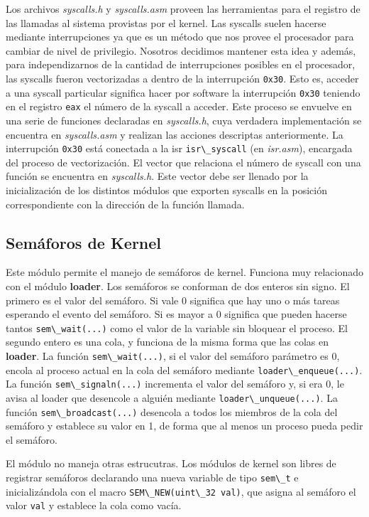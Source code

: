 \documentclass[a4paper]{article}
\newcommand{\file}[1]{\textit{#1}}
\newcommand{\func}[1]{\lstinline{#1}}
\begin{document}
Los archivos \file{syscalls.h} y \file{syscalls.asm} proveen las herramientas para el registro de las llamadas al sistema provistas por el kernel. Las syscalls suelen hacerse mediante interrupciones ya que es un método que nos provee el procesador para cambiar de nivel de privilegio. Nosotros decidimos mantener esta idea y además, para independizarnos de la cantidad de interrupciones posibles en el procesador, las syscalls fueron vectorizadas a dentro de la interrupción \func{0x30}. Esto es, acceder a una syscall particular significa hacer por software la interrupción \func{0x30} teniendo en el registro \func{eax} el número de la syscall a acceder. Este proceso se envuelve en una serie de funciones declaradas en \file{syscalls.h}, cuya verdadera implementación se encuentra en \file{syscalls.asm} y realizan las acciones descriptas anteriormente. La interrupción \func{0x30} está conectada a la isr \func{isr\_syscall} (en \file{isr.asm}), encargada del proceso de vectorización. El vector que relaciona el número de syscall con una función se encuentra en \file{syscalls.h}. Este vector debe ser llenado por la inicialización de los distintos módulos que exporten syscalls en la posición correspondiente con la dirección de la función llamada. 

\subsection{Semáforos de Kernel}

Este módulo permite el manejo de semáforos de kernel. Funciona muy relacionado con el módulo \textbf{loader}. Los semáforos se conforman de dos enteros sin signo. El primero es el valor del semáforo. Si vale 0 significa que hay uno o más tareas esperando el evento del semáforo. Si es mayor a 0 significa que pueden hacerse tantos \func{sem\_wait(...)} como el valor de la variable sin bloquear el proceso. El segundo entero es una cola, y funciona de la misma forma que las colas en \textbf{loader}. La función \func{sem\_wait(...)}, si el valor del semáforo parámetro es 0, encola al proceso actual en la cola del semáforo mediante \func{loader\_enqueue(...)}. La función \func{sem\_signaln(...)} incrementa el valor del semáforo y, si era 0, le avisa al loader que desencole a alguién mediante \func{loader\_unqueue(...)}. La función \func{sem\_broadcast(...)} desencola a todos los miembros de la cola del semáforo y establece su valor en 1, de forma que al menos un proceso pueda pedir el semáforo. 

El módulo no maneja otras estrucutras. Los módulos de kernel son libres de registrar semáforos declarando una nueva variable de tipo \func{sem\_t} e inicializándola con el macro \func{SEM\_NEW(uint\_32 val)}, que asigna al semáforo el valor \func{val} y establece la cola como vacía. 
\end{document}

